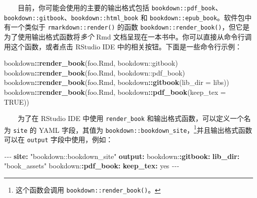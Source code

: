\documentclass[
  12pt,
]{krantz}
\newenvironment{Shaded}{\begin{snugshade}}{\end{snugshade}}
\newcommand{\AttributeTok}[1]{\textcolor[rgb]{0.13,0.29,0.53}{#1}}
\newcommand{\CharTok}[1]{\textcolor[rgb]{0.31,0.60,0.02}{#1}}
\newcommand{\ConstantTok}[1]{\textcolor[rgb]{0.56,0.35,0.01}{#1}}
\newcommand{\FunctionTok}[1]{\textcolor[rgb]{0.13,0.29,0.53}{\textbf{#1}}}
\newcommand{\KeywordTok}[1]{\textcolor[rgb]{0.13,0.29,0.53}{\textbf{#1}}}
\newcommand{\NormalTok}[1]{#1}
\newcommand{\PreprocessorTok}[1]{\textcolor[rgb]{0.56,0.35,0.01}{\textit{#1}}}
\newcommand{\SpecialCharTok}[1]{\textcolor[rgb]{0.81,0.36,0.00}{\textbf{#1}}}
\newcommand{\StringTok}[1]{\textcolor[rgb]{0.31,0.60,0.02}{#1}}
\theoremstyle{definition}
\theoremstyle{definition}
\theoremstyle{definition}
\theoremstyle{definition}
\theoremstyle{remark}
\begin{document}
  目前，你可能会使用的主要的输出格式包括 \texttt{bookdown::pdf\_book}、\texttt{bookdown::gitbook}、\texttt{bookdown::html\_book} 和 \texttt{bookdown::epub\_book}。软件包中有一个类似于 \texttt{rmarkdown::render()} 的函数 \texttt{bookdown::render\_book()}，但它是为了使用输出格式函数将\emph{多个} Rmd 文档呈现在一本书中。你可以直接从命令行调用这个函数，或者点击 RStudio IDE 中的相关按钮。下面是一些命令行示例：

\begin{Shaded}
\begin{Highlighting}[]
\NormalTok{bookdown}\SpecialCharTok{::}\FunctionTok{render\_book}\NormalTok{(}\StringTok{\textquotesingle{}foo.Rmd\textquotesingle{}}\NormalTok{, }\StringTok{\textquotesingle{}bookdown::gitbook\textquotesingle{}}\NormalTok{)}
\NormalTok{bookdown}\SpecialCharTok{::}\FunctionTok{render\_book}\NormalTok{(}\StringTok{\textquotesingle{}foo.Rmd\textquotesingle{}}\NormalTok{, }\StringTok{\textquotesingle{}bookdown::pdf\_book\textquotesingle{}}\NormalTok{)}
\NormalTok{bookdown}\SpecialCharTok{::}\FunctionTok{render\_book}\NormalTok{(}\StringTok{\textquotesingle{}foo.Rmd\textquotesingle{}}\NormalTok{, bookdown}\SpecialCharTok{::}\FunctionTok{gitbook}\NormalTok{(}\AttributeTok{lib\_dir =} \StringTok{\textquotesingle{}libs\textquotesingle{}}\NormalTok{))}
\NormalTok{bookdown}\SpecialCharTok{::}\FunctionTok{render\_book}\NormalTok{(}\StringTok{\textquotesingle{}foo.Rmd\textquotesingle{}}\NormalTok{, bookdown}\SpecialCharTok{::}\FunctionTok{pdf\_book}\NormalTok{(}\AttributeTok{keep\_tex =} \ConstantTok{TRUE}\NormalTok{))}
\end{Highlighting}
\end{Shaded}

  为了在 RStudio IDE 中使用 \texttt{render\_book} 和输出格式函数，可以定义一个名为 \texttt{site} 的 YAML 字段，其值为 \texttt{bookdown::bookdown\_site}，\footnote{这个函数会调用 \texttt{bookdown::render\_book()}。}并且输出格式函数可以在 \texttt{output} 字段中使用，例如：

\begin{Shaded}
\begin{Highlighting}[]
\PreprocessorTok{{-}{-}{-}}
\FunctionTok{site}\KeywordTok{:}\AttributeTok{ }\StringTok{"bookdown::bookdown\_site"}
\FunctionTok{output}\KeywordTok{:}
\AttributeTok{  bookdown:}\FunctionTok{:gitbook}\KeywordTok{:}
\AttributeTok{    }\FunctionTok{lib\_dir}\KeywordTok{:}\AttributeTok{ }\StringTok{"book\_assets"}
\AttributeTok{  bookdown:}\FunctionTok{:pdf\_book}\KeywordTok{:}
\AttributeTok{    }\FunctionTok{keep\_tex}\KeywordTok{:}\AttributeTok{ }\CharTok{yes}
\PreprocessorTok{{-}{-}{-}}
\end{Highlighting}
\end{Shaded}
\end{document}
